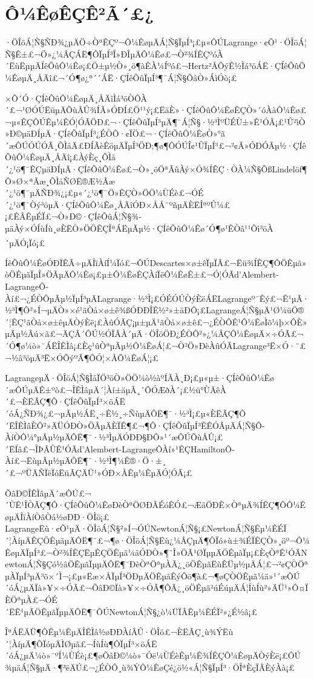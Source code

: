 \documentclass[A4,twoside]{ctexart}
\newcommand{\supercite}[1]{\textsuperscript{\cite{#1}}}
\begin{document}
\section{Ô¼ÊøÊÇÊ²Ã´£¿}
\label{sec:constraint}


·ÖÎöÁ¦Ñ§ÑÐ¾¿µÄÖ÷ÒªÊÇº¬Ô¼ÊøµÄÁ¦Ñ§ÏµÍ³¡£µ«ÔÚLagrange·¢Õ¹·ÖÎöÁ¦Ñ§Ê±£¬Ö»¿¼ÂÇÁË¶ÔÏµÍ³Î»ÐÎµÄÔ¼Êø£¬Ò²¾ÍÊÇºóÀ´ËùËµµÄÍêÕûÔ¼Êø¡£Ö±µ½Ò»¸ö¶àÊÀ¼Íºó£¬Hertz²ÅÕýÊ½Ìá³öÁË·ÇÍêÕûÔ¼ÊøµÄ¸ÅÄî£¬´Ó¶ø¿ª´´ÁË·ÇÍêÕûÏµÍ³¶¯Á¦Ñ§ÕâÒ»ÁìÓò¡£

×Ô´Ó·ÇÍêÕûÔ¼ÊøµÄ¸ÅÄîÌá³öÒÔÀ´£¬¹ØÓÚËüµÄÕùÂÛ¾ÍÃ»ÓÐÍ£Ö¹¹ý¡£ËäÈ»·ÇÍêÕûÔ¼ÊøÊÇÒ»´óÀàÔ¼Êø£¬µ«ÊÇÔÚÊµ¼ÊÓ¦ÓÃÖÐ£¬·ÇÍêÕûÏµÍ³µÄ¶¯Á¦Ñ§·½³ÌºÜÉÙ±»Ê¹ÓÃ¡£¹Û²ìÒ»Ð©µäÐÍµÄ·ÇÍêÕûÏµÍ³¿ÉÒÔ·¢ÏÖ£¬·ÇÍêÕûÔ¼ÊøÒ»°ã´æÔÚÓÚÓÃ¸ÕÌåÄ£ÐÍÃèÊöµÄÏµÍ³ÖÐ;¶ø¶ÔÓÚÎ¢¹ÛÏµÍ³£¬²¢Ã»ÓÐÓÃµ½·ÇÍêÕûÔ¼ÊøµÄ¸ÅÄî¡£ÀýÈç¸ÕÌå´¿¹ö¶¯ÊÇµäÐÍµÄ·ÇÍêÕûÔ¼Êø£¬Ò»¸öÖªÃûÀý×Ó¾ÍÊÇ·ÒÀ¼Ñ§ÕßLindel\"of¶Ô»Ø×ªÃæ¸ÕÌåÑØË®Æ½Ãæ´¿¹ö¶¯µÄÑÐ¾¿¡£µ«´¿¹ö¶¯Ö»ÊÇÒ»ÖÖ¼ÙÉè£¬ÓÉ´¿¹ö¶¯Òý³öµÄ·ÇÍêÕûÔ¼Êø¸ÅÄîÓÐ×ÅÅ¨ºñµÄÈËÎªºÛ¼£¡£ÊÂÊµÉÏ£¬Ò»Ð©·ÇÍêÕûÁ¦Ñ§¾­µäÀý×ÓÍùÍù¸øÈËÒ»ÖÖÊÇÎªÁËµÃµ½·ÇÍêÕûÔ¼Êø´Ó¶ø¹ÊÒâ¹¹Ôì³öÀ´µÄÓ¡Ïó\supercite{2}¡£

ÍêÕûÔ¼ÊøÓÐÏÊÃ÷µÄÎïÀíÍ¼Ïó£¬ÔÚDescartes×ø±êÏµÏÂ£¬Ëü¾ÍÊÇ¶ÔÖÊµã»òÖÊµãÏµÎ»ÖÃµÄÔ¼Êø¡£µ±Ô¼ÊøÊÇÀíÏëÔ¼ÊøÊ±£¬Ó¦ÓÃd'Alembert-LagrangeÔ­Àí£¬¿ÉÒÔµÃµ½ÏµÍ³µÄLagrange·½³Ì¡£ÓÉÓÚÒýÈëÁËLagrangeº¯Êý£¬Ê¹µÃ·½³Ì¶Ô²»Í¬µÄÒ»×é¹ãÒå×ø±ê¾ßÓÐÐÎÊ½²»±äÐÔ¡£LagrangeÁ¦Ñ§µÄ¹Ø¼üÖ®´¦ÊÇ¹ãÒå×ø±êµÄÒýÈë¡£ÀûÓÃÇ¡µ±µÄ¹ãÒå×ø±ê£¬¿ÉÒÔÊ¹Ô¼ÊøÌõ¼þ×ÔÈ»µÃµ½Âú×ã£¬ÄÇÃ´ÔÚ½ÓÏÂÀ´µÄ·ÖÎöÖÐ¿ÉÒÔ²»¿¼ÂÇÔ¼ÊøµÄ×÷ÓÃ£¬´Ó¶ø¼ò»¯ÁËÎÊÌâ¡£Èç¹ûÒªµÃµ½Ô¼ÊøÁ¦£¬Ò²Ö»ÐèÀûÓÃLagrange³Ë×Ó·¨£¬½â³öµÄ³Ë×ÓÕýºÃ¶ÔÓ¦×ÅÔ¼ÊøÁ¦¡£

LagrangeµÄ·ÖÎöÁ¦Ñ§ÌåÏÖ³öÒ»ÖÖ¼ò½àºÍÃÀ¸Ð¡£µ«µ±·ÇÍêÕûÔ¼Êø´æÔÚµÄÊ±ºò£¬ÎÊÌâµÄ´¦Àí±äµÃ¸´ÔÓÆðÀ´¡£½ü°ÙÄêÀ´£¬ÈËÃÇ¶Ô·ÇÍêÕûÏµÍ³×öÁË´óÁ¿ÑÐ¾¿£¬µÃµ½ÁË¸÷Ê½¸÷ÑùµÄÔË¶¯·½³Ì¡£µ«ÈËÃÇ¶Ô´ËÎÊÌâÈÔ²»ÄÜÓÐÒ»ÖÂµÄÈÏÊ¶£¬¶Ô·ÇÍêÕûÏµÍ³ÊÊÓÃµÄÁ¦Ñ§Ô­ÀíÒÔ¼°µÃµ½µÄÔË¶¯·½³ÌµÄÓÐÐ§ÐÔ»¹´æÔÚÕùÂÛ¡£´ËÍâ£¬ÎÞÂÛÊ¹ÓÃd'Alembert-LagrangeÔ­Àí»¹ÊÇHamiltonÔ­Àí£¬ËùµÃµ½µÄÔË¶¯·½³Ì¶¼Ê®·Ö·±¸´£¬ºÜÄÑÏëÏóËüÃÇÄÜ¹»ÓÐ×ÅÊµ¼ÊµÄÓ¦ÓÃ¡£

ÕâÐ©ÎÊÌâµÄ´æÔÚ£¬´ÙÊ¹ÎÒÃÇ¶Ô·ÇÍêÕûÔ¼ÊøÐèÒªÖØÐÂÉóÊÓ£¬ÆäÖÐÊ×ÒªµÄ¾ÍÊÇ¶ÔÔ¼ÊøµÄÎïÀíÒâÒå½øÐÐ·ÖÎö¡£
LagrangeËù·¢Õ¹µÄ·ÖÎöÁ¦Ñ§²»Í¬ÓÚNewtonÁ¦Ñ§¡£NewtonÁ¦Ñ§Êµ¼ÊÉÏ´¦ÀíµÄÊÇÖÊµãµÄÔË¶¯£¬¶ø·ÖÎöÁ¦Ñ§Ëù¿¼ÂÇµÄ¶ÔÏó»ù±¾ÉÏÊÇÒ»¸öº¬Ô¼ÊøµÄÏµÍ³£¬Ò²¾ÍÊÇËµÊÇÖÊµã¼äÓÐÒ»¶¨Î»ÖÃ¹ØÏµµÄÖÊµãÏµ¡£ÈçÒªÊ¹ÓÃNewtonÁ¦Ñ§Çó½âÖÊµãÏµµÄÔË¶¯ÐèÒªÖªµÀÃ¿¸öÖÊµãËùÊÜµ½µÄÁ¦£¬²¢ÇÒÖªµÀÏµÍ³µÄ³õ×´Ì¬¡£µ«Ëæ×ÅÏµÍ³ÖÐµÄÖÊµãÊýÔö¶à£¬¶øÇÒÖÊµã¼ä»¹´æÔÚ´óÁ¿µÄÏà»¥×÷ÓÃ£¬ÕâÐ©Ïà»¥×÷ÓÃ¶ÔÃ¿¸öÖÊµã²úÉúµÄÁ¦ÍùÍù²»ÄÜ¹»Ô¤ÏÈÖªµÀ£¬ÓÉ´ËÊ¹µÃÖÊµãÏµµÄÔË¶¯ÔÚNewtonÁ¦Ñ§¿ò¼ÜÏÂÊµ¼ÊÉÏ²»¿É½â¡£

ÎªÁËÄÜ¶ÔÊµ¼ÊµÄÎÊÌâ½øÐÐÀíÂÛ·ÖÎö£¬ÈËÃÇ¸ù¾ÝËù´¦ÀíµÄ¶ÔÏóµÄÌØµã£¬ÍùÍù¶ÔÏµÍ³×öÁË´óÁ¿µÄ¼ò»¯ºÍ¼ÙÉè¡£¶øÕâÐ©¼ò»¯Óë¼ÙÉèÊµ¼Ê¾ÍÊÇÔ¼ÊøµÄÒýÈë¡£ÔÚ¾­µäÁ¦Ñ§µÄ·¶³ëÄÚ£¬¿ÉÒÔ¸ù¾ÝÔ¼ÊøÇé¿ö½«Á¦Ñ§ÏµÍ³·ÖÎªÈçÏÂÈýÀà¡£
\end{document}
